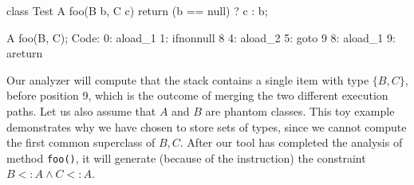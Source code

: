 \begin{multicols}{2}
  \begin{javacode}
    class Test {
      A foo(B b, C c) {
        return (b == null) ?
        c : b;
      }
    }
  \end{javacode}
  \columnbreak
  \begin{bytecode}
  A foo(B, C);
    Code:
     0:       aload_1
     1:       ifnonnull 8
     4:       aload_2
     5:       goto 9
     8:       aload_1
     9:       areturn
  \end{bytecode}
\end{multicols}

Our analyzer will compute that the stack contains a single item with
type $\{B,C\}$, before position 9, which is the outcome of merging the
two different execution paths. Let us also assume that $A$ and $B$ are
phantom classes. This toy example demonstrates why we have chosen to
store sets of types, since we cannot compute the first common
superclass of $B,C$. After our tool has completed the analysis of
method \texttt{foo()}, it will generate (because of the 
instruction) the constraint $B <: A \land C <: A$.






